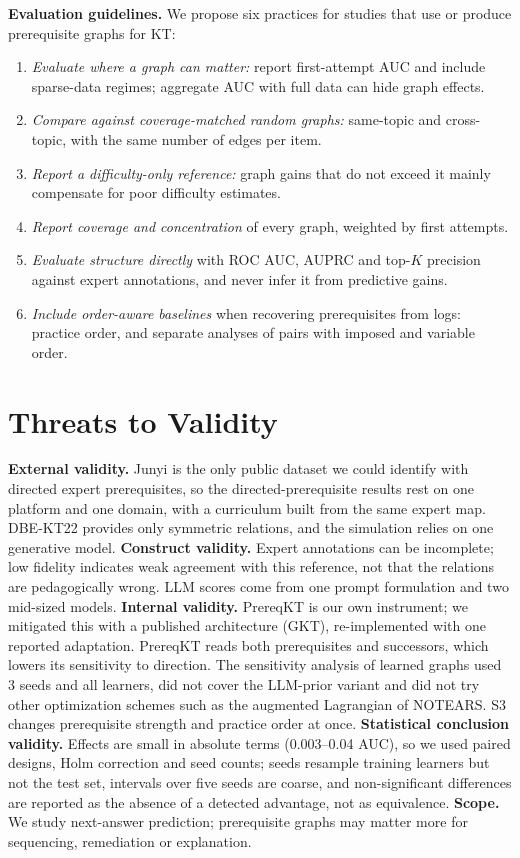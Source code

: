 \documentclass[lettersize,journal]{IEEEtran}
\begin{document}
\textbf{Evaluation guidelines.} We propose six practices for studies that use or produce prerequisite graphs for KT:
\begin{enumerate}
\item \emph{Evaluate where a graph can matter:} report first-attempt AUC and include sparse-data regimes; aggregate AUC with full data can hide graph effects.
\item \emph{Compare against coverage-matched random graphs:} same-topic and cross-topic, with the same number of edges per item.
\item \emph{Report a difficulty-only reference:} graph gains that do not exceed it mainly compensate for poor difficulty estimates.
\item \emph{Report coverage and concentration} of every graph, weighted by first attempts.
\item \emph{Evaluate structure directly} with ROC AUC, AUPRC and top-$K$ precision against expert annotations, and never infer it from predictive gains.
\item \emph{Include order-aware baselines} when recovering prerequisites from logs: practice order, and separate analyses of pairs with imposed and variable order.
\end{enumerate}

\section{Threats to Validity}
\label{sec:limits}
\textbf{External validity.} Junyi is the only public dataset we could identify with directed expert prerequisites, so the directed-prerequisite results rest on one platform and one domain, with a curriculum built from the same expert map. DBE-KT22 provides only symmetric relations, and the simulation relies on one generative model. \textbf{Construct validity.} Expert annotations can be incomplete; low fidelity indicates weak agreement with this reference, not that the relations are pedagogically wrong. LLM scores come from one prompt formulation and two mid-sized models. \textbf{Internal validity.} PrereqKT is our own instrument; we mitigated this with a published architecture (GKT), re-implemented with one reported adaptation. PrereqKT reads both prerequisites and successors, which lowers its sensitivity to direction. The sensitivity analysis of learned graphs used 3 seeds and all learners, did not cover the LLM-prior variant and did not try other optimization schemes such as the augmented Lagrangian of NOTEARS. S3 changes prerequisite strength and practice order at once. \textbf{Statistical conclusion validity.} Effects are small in absolute terms (0.003--0.04 AUC), so we used paired designs, Holm correction and seed counts; seeds resample training learners but not the test set, intervals over five seeds are coarse, and non-significant differences are reported as the absence of a detected advantage, not as equivalence. \textbf{Scope.} We study next-answer prediction; prerequisite graphs may matter more for sequencing, remediation or explanation.
\end{document}
